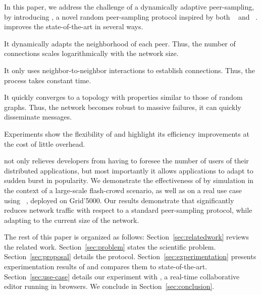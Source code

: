In this paper, we address the challenge of a dynamically adaptive peer-sampling,
by introducing \SPRAY, a novel random peer-sampling protocol inspired by both
\SCAMP~\cite{ganesh2001scamp,ganesh2003peer} and
\CYCLON~\cite{voulgaris2005cyclon}. \SPRAY improves the state-of-the-art in
several ways.
\begin{inparaenum}[(i)]
\item It dynamically adapts the neighborhood of each peer. Thus, the number of
  connections scales logarithmically with the network size.
\item It only uses neighbor-to-neighbor interactions to establish
  connections. Thus, the process takes constant time.
\item It quickly converges to a topology with properties similar to
  those of random graphs. Thus, the network becomes robust to massive
  failures, it can quickly disseminate messages.
\item Experiments show the flexibility of \SPRAY and highlight its
  efficiency improvements at the cost of little overhead.
\end{inparaenum}

\SPRAY not only relieves developers from having to foresee the number
of users of their distributed applications, but most importantly it
allows applications to adapt to sudden burst in popularity. We
demonstrate the effectiveness of \SPRAY by simulation in the context
of a large-scale flash-crowd scenario, as well as on a real use case
using \CRATE~\cite{nedelec2016crate}, deployed on Grid'5000. Our
results demonstrate that \SPRAY significantly reduces network traffic
with respect to a standard peer-sampling protocol, while adapting to
the current size of the network.


The rest of this paper is organized as follows: Section~\ref{sec:relatedwork}
reviews the related work. Section~\ref{sec:problem} states the scientific
problem. Section~\ref{sec:proposal} details the \SPRAY
protocol. Section~\ref{sec:experimentation} presents experimentation results of
\SPRAY and compares them to state-of-the-art. Section~\ref{sec:use-case} details
our experiment with \CRATE, a real-time collaborative editor running in
browsers. We conclude in Section~\ref{sec:conclusion}.




